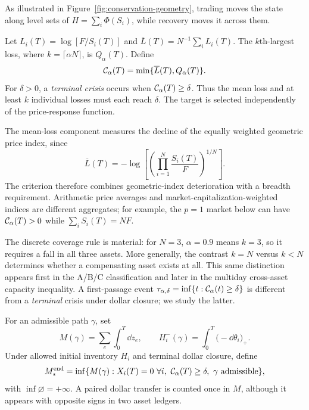 \documentclass[review,hidelinks,onefignum,onetabnum]{siamonline250211}
\begin{document}
As illustrated in Figure~\ref{fig:conservation-geometry},
trading moves the state along level sets of
$H=\sum_i\Phi(S_i)$, while recovery moves it across them.

\begin{definition}\label{def:crash}
Let $L_i(T)=\log[F/S_i(T)]$ and $\overline L(T)=N^{-1}\sum_i L_i(T)$. The $k$th-largest loss, where $k=\lceil\alpha N\rceil$, is $Q_\alpha(T)$. Define
\begin{equation}\label{eq:crash}
\mathcal{C}_\alpha(T)=\min\{\overline L(T),Q_\alpha(T)\}.
\end{equation}
For $\delta>0$, a \emph{terminal crisis} occurs when $\mathcal{C}_\alpha(T)\ge\delta$. Thus the mean loss and at least $k$ individual losses must each reach $\delta$. The target is selected independently of the price-response function.
\end{definition}

The mean-loss component measures the decline of the equally weighted geometric price index, since
\[
\overline L(T)=-\log\!\left[\left(\prod_{i=1}^{N}\frac{S_i(T)}{F}\right)^{1/N}\right].
\]
The criterion therefore combines geometric-index deterioration with a breadth requirement. Arithmetic price averages and market-capitalization-weighted indices are different aggregates; for example, the $p=1$ market below can have $\mathcal{C}_\alpha(T)>0$ while $\sum_i S_i(T)=NF$.

The discrete coverage rule is material: for $N=3$, $\alpha=0.9$ means $k=3$, so it requires a fall in all three assets. More generally, the contrast $k=N$ versus $k<N$ determines whether a compensating asset exists at all. This same distinction appears first in the A/B/C classification and later in the multiday cross-asset capacity inequality. A first-passage event $\tau_{\alpha,\delta}=\inf\{t:\mathcal{C}_\alpha(t)\ge\delta\}$ is different from a \emph{terminal} crisis under dollar closure; we study the latter.

\begin{definition}\label{def:budget}
For an admissible path $\gamma$, set
\begin{equation}\label{eq:resource}
M(\gamma)=\sum_e\int_0^T\dd z_e,\qquad
H_i^-(\gamma)=\int_0^T\big(-\dd\theta_i\big)_+.
\end{equation}
Under allowed initial inventory $H_i$ and terminal dollar closure, define
\begin{equation}\label{eq:minbudget}
M_*^{\rm end}=\inf\{M(\gamma): X_i(T)=0\ \forall i,\ \Cris_\alpha(T)\ge\delta,\ \gamma\text{ admissible}\},
\end{equation}
with $\inf\varnothing=+\infty$. A paired dollar transfer is counted once in $M$, although it appears with opposite signs in two asset ledgers.
\end{definition}
\end{document}
